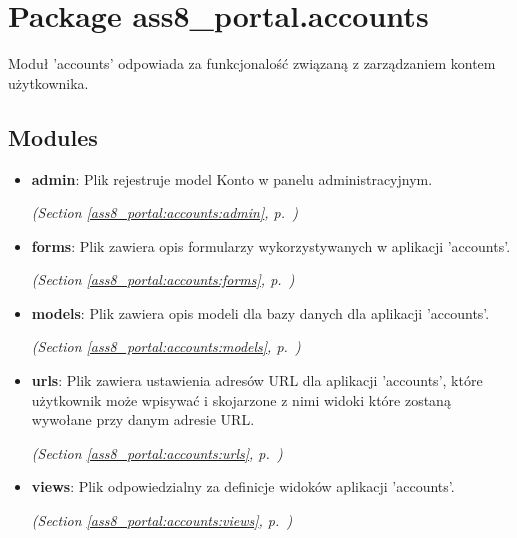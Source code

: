 %
%
%


\section{Package ass8\_portal.accounts}

    \label{ass8_portal:accounts}
Moduł 'accounts' odpowiada za funkcjonalość związaną z zarządzaniem kontem 
użytkownika.



\subsection{Modules}

\begin{itemize}
\setlength{\parskip}{0ex}
\item \textbf{admin}: Plik rejestruje model Konto w panelu administracyjnym.



  \textit{(Section \ref{ass8_portal:accounts:admin}, p.~\pageref{ass8_portal:accounts:admin})}

\item \textbf{forms}: Plik zawiera opis formularzy wykorzystywanych w aplikacji 'accounts'.



  \textit{(Section \ref{ass8_portal:accounts:forms}, p.~\pageref{ass8_portal:accounts:forms})}

\item \textbf{models}: Plik zawiera opis modeli dla bazy danych dla aplikacji 'accounts'.



  \textit{(Section \ref{ass8_portal:accounts:models}, p.~\pageref{ass8_portal:accounts:models})}

\item \textbf{urls}: 
Plik zawiera ustawienia adresów URL dla aplikacji 'accounts', 
które użytkownik może wpisywać i skojarzone z nimi widoki które zostaną wywołane przy 
danym adresie URL. 


  \textit{(Section \ref{ass8_portal:accounts:urls}, p.~\pageref{ass8_portal:accounts:urls})}

\item \textbf{views}: Plik odpowiedzialny za definicje widoków aplikacji 'accounts'.



  \textit{(Section \ref{ass8_portal:accounts:views}, p.~\pageref{ass8_portal:accounts:views})}

\end{itemize}


